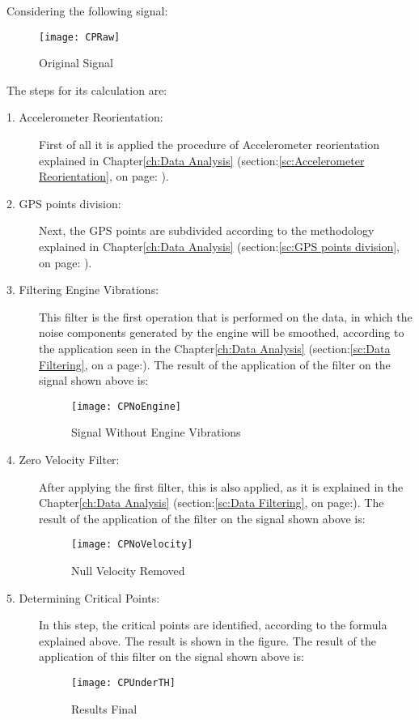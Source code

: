 \documentclass[tesi]{subfiles}
\begin{document}
Considering the following signal:

\begin{figure}[H]
\centering
\texttt{[image: CPRaw]}
\caption{Original Signal}
\end{figure}

The steps for its calculation are:

\begin{description}
\item[1. Accelerometer Reorientation:] First of all it is applied the procedure of Accelerometer reorientation explained in Chapter\ref{ch:Data Analysis} (section:\ref{sc:Accelerometer Reorientation}, on page: \pageref{sc:Accelerometer Reorientation}).
\item[2. GPS points division:] Next, the GPS points are subdivided according to the methodology explained in Chapter\ref{ch:Data Analysis} (section:\ref{sc:GPS points division}, on page: \pageref{sc:GPS points division}).
\item[3. Filtering Engine Vibrations:] This filter is the first operation that is performed on the data, in which the noise components generated by the engine will be smoothed, according to the application seen in the Chapter\ref{ch:Data Analysis} (section:\ref{sc:Data Filtering}, on a page:\pageref{sssc:Remove Engine Vibrations Filter}).
The result of the application of the filter on the signal shown above is:
 \begin{figure}[H]
\centering
\texttt{[image: CPNoEngine]}
\caption{Signal Without Engine Vibrations}
\end{figure}
\item[4. Zero Velocity Filter:] After applying the first filter, this is also applied, as it is explained in the Chapter\ref{ch:Data Analysis} (section:\ref{sc:Data Filtering}, on page:\pageref{sssc:Zero Velocity Filter}).
The result of the application of the filter on the signal shown above is:
 \begin{figure}[H]
\centering
\texttt{[image: CPNoVelocity]}
\caption{Null Velocity Removed}
\end{figure}
\item[5. Determining Critical Points:] In this step, the critical points are identified, according to the formula explained above. The result is shown in the figure.
The result of the application of this filter on the signal shown above	 is:
 \begin{figure}[H]
\centering
\texttt{[image: CPUnderTH]}
\caption{Results Final}

\end{figure}
\end{description}
\end{document}

